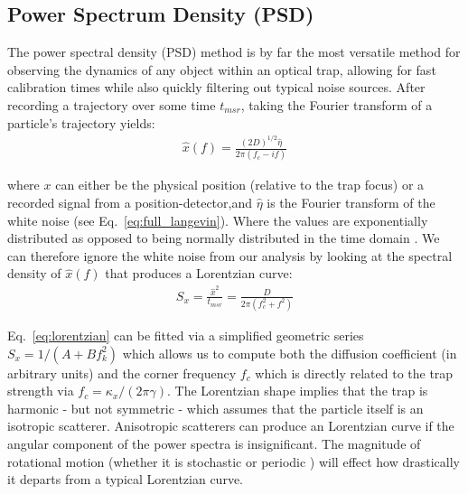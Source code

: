 \subsection{Power Spectrum Density (PSD)}
The power spectral density (PSD) method is by far the most versatile 
method for observing the dynamics of any object within an optical trap, 
allowing for fast calibration times while also quickly filtering out 
typical noise sources. After recording a trajectory over some time 
$t_{msr}$, taking the Fourier transform of a particle's trajectory 
yields:
\begin{align}
	\hat{x}(f) = \frac{(2D)^{1/2}\hat{\eta}}{2\pi(f_c-if)}
\end{align}

where $x$ can either be the physical position (relative to the trap
focus) or a recorded signal from a position-detector,and $\hat{\eta}$ 
is the Fourier transform of the white noise (see Eq.~\eqref{eq:full_langevin}). 
Where the values are exponentially distributed as opposed to being 
normally distributed in the time domain \cite{BergSoerensen2004}.
We can therefore ignore the white noise from our analysis by looking 
at the spectral density of $\hat{x}(f)$ that produces a Lorentzian
curve: 
\begin{align}
	\label{eq:lorentzian}
	S_x = \frac{\hat{x}^2}{t_{msr}} = \frac{D}{2\pi(f_c^2+f^2)}
\end{align}
 

Eq.~\eqref{eq:lorentzian} can be fitted via a simplified geometric 
series $S_x = 1/(A+Bf_k^2)$ which allows us to compute both the 
diffusion coefficient (in arbitrary units) and the corner frequency 
$f_c$ which is directly related to the trap strength via $f_c = 
\kappa_x/(2\pi\gamma)$. The Lorentzian shape implies that the trap 
is harmonic - but not symmetric - which assumes that the particle 
itself is an isotropic scatterer. Anisotropic scatterers can 
produce an Lorentzian curve if the angular component of the power
spectra is insignificant. The magnitude of rotational motion 
(whether it is stochastic \cite{Bang2020} or periodic 
\cite{Yogesha2012}) will effect how drastically it departs from a 
typical Lorentzian curve.

